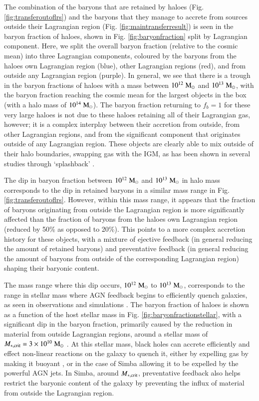 \documentclass[fleqn,usenatbib]{mnras}
\newcommand{\msolar}{\;{\rm M}_{\odot}}
\newcommand{\simba}{{\sc Simba}}
\begin{document}
The combination of the baryons that are retained by haloes (Fig.
\ref{fig:transferoutoflrs}) and the baryons that they manage to accrete from
sources outside their Lagrangian region (Fig. \ref{fig:maintransferresult})
is seen in the baryon fraction of haloes, shown in Fig.
\ref{fig:baryonfraction} split by Lagrangian component. Here, we split the
overall baryon fraction (relative to the cosmic mean) into three Lagrangian
components, coloured by the baryons from the haloes own Lagrangian region
(blue), other Lagrangian regions (red), and from outside any Lagrangian
region (purple). In general, we see that there is a trough in the baryon
fractions of haloes with a mass between $10^{12}\msolar{}$ and
$10^{13}\msolar{}$, with the baryon fraction reaching the cosmic mean for the
largest objects in the box (with a halo mass of $10^{14}\msolar{}$). The
baryon fraction returning to $f_b = 1$ for these very large haloes is not due
to these haloes retaining all of their Lagrangian gas, however; it is a
complex interplay between their accretion from outside, from other Lagrangian
regions, and from the significant component that originates outside of any
Lagrangian region. These objects are clearly able to mix outside of their
halo boundaries, swapping gas with the IGM, as has been shown in several
studies through `splashback' \citep{Mansfield2017, Diemer2017}.

The dip in baryon fraction between $10^{12}\msolar{}$ and $10^{13}\msolar{}$ in halo
mass corresponds to the dip in retained baryons in a similar mass range in
Fig. \ref{fig:transferoutoflrs}. However, within this mass range, it appears
that the fraction of baryons originating from outside the Lagrangian region is
more significantly affected than the fraction of baryons from the haloes own
Lagrangian region (reduced by 50\% as opposed to 20\%). This points
to a more complex accretion history for these objects, with a mixture of
ejective feedback (in general reducing the amount of retained baryons) and preventative
feedback (in general reducing the amount of baryons from outside of the
corresponding Lagrangian region) shaping their baryonic content.

The mass range where this dip occurs, $10^{12}\msolar{}$ to
$10^{13}\msolar{}$, corresponds to the range in stellar mass
\citep[$10^{11}\msolar{}$ to $10^{12}\msolar{}$,][]{Moster2013} where AGN
feedback begins to efficiently quench galaxies, as seen in observations
\citep{Kauffmann2003} and simulations \citep{Bower2017, Taylor2017}. The
baryon fraction of haloes is shown as a function of the host stellar mass in
Fig. \ref{fig:baryonfractionstellar}, with a significant dip in the baryon
fraction, primarily caused by the reduction in material from outside
Lagrangian regions, around a stellar mass of $M_{*, {\rm crit}} = 3\times10^{10}
\msolar{}$ \citep{Kauffmann2003}. At this stellar mass, black holes can accrete
efficiently and effect non-linear reactions on the galaxy to quench it,
either by expelling gas by making it buoyant \citep{Bower2017}, or in the
case of \simba{} allowing it to be expelled by the powerful AGN jets. In
\simba{}, around $M_{*, {\rm crit}}$, preventative feedback also helps
restrict the baryonic content of the galaxy by preventing the influx of material from outside
the Lagrangian region.
\end{document}

